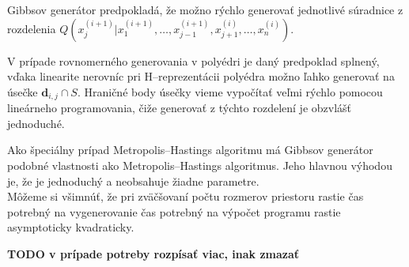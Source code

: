 Gibbsov generátor predpokladá, že možno rýchlo generovať jednotlivé súradnice z rozdelenia $Q(x^{(i+1)}_j | x^{(i+1)}_1, \dots, x^{(i+1)}_{j-1}, x^{(i)}_{j+1}, \dots, x^{(i)}_n)$.

V prípade rovnomerného generovania v polyédri je daný predpoklad splnený, vďaka linearite nerovníc pri H--reprezentácii polyédra možno ľahko generovať na úsečke $\mathbf d_{i,j} \cap S$. Hraničné body úsečky vieme vypočítať veľmi rýchlo pomocou lineárneho programovania, čiže generovať z týchto rozdelení je obzvlášť jednoduché.

Ako špeciálny prípad Metropolis--Hastings algoritmu má Gibbsov generátor podobné vlastnosti ako Metropolis--Hastings algoritmus. Jeho hlavnou výhodou je, že je jednoduchý a neobsahuje žiadne parametre.\\

Môžeme si všimnúť, že pri zväčšovaní počtu rozmerov priestoru rastie čas potrebný na vygenerovanie čas potrebný na výpočet programu rastie asymptoticky kvadraticky.

\textbf{TODO v prípade potreby rozpísať viac, inak zmazať}